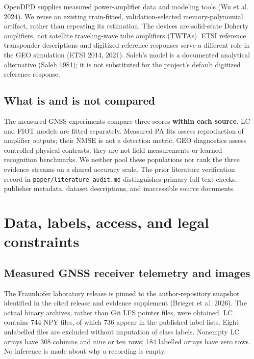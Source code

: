 \documentclass[
  10pt,
]{article}
\begin{document}
OpenDPD supplies measured power-amplifier data and modeling tools (Wu et
al. 2024). We reuse an existing train-fitted, validation-selected
memory-polynomial artifact, rather than repeating its estimation. The
devices are solid-state Doherty amplifiers, not satellite traveling-wave
tube amplifiers (TWTAs). ETSI reference transponder descriptions and
digitized reference responses serve a different role in the GEO
simulation (ETSI 2014, 2021). Saleh's model is a documented analytical
alternative (Saleh 1981); it is not substituted for the project's
default digitized reference response.

\subsection{What is and is not
compared}\label{what-is-and-is-not-compared}

The measured GNSS experiments compare three scores \textbf{within each
source}. LC and FIOT models are fitted separately. Measured PA fits
assess reproduction of amplifier outputs; their NMSE is not a detection
metric. GEO diagnostics assess controlled physical contrasts; they are
not field measurements or learned recognition benchmarks. We neither
pool these populations nor rank the three evidence streams on a shared
accuracy scale. The prior literature verification record in
\texttt{paper/literature\_audit.md} distinguishes primary full-text
checks, publisher metadata, dataset descriptions, and inaccessible
source documents.

\section{Data, labels, access, and legal
constraints}\label{data-labels-access-and-legal-constraints}

\subsection{Measured GNSS receiver telemetry and
images}\label{measured-gnss-receiver-telemetry-and-images}

The Fraunhofer laboratory release is pinned to the author-repository
snapshot identified in the cited release and evidence supplement
(Brieger et al. 2026). The actual binary archives, rather than Git LFS
pointer files, were obtained. LC contains 744 NPY files, of which 736
appear in the published label lists. Eight unlabelled files are excluded
without imputation of class labels. Nonempty LC arrays have 308 columns
and nine or ten rows; 184 labelled arrays have zero rows. No inference
is made about why a recording is empty.
\end{document}
